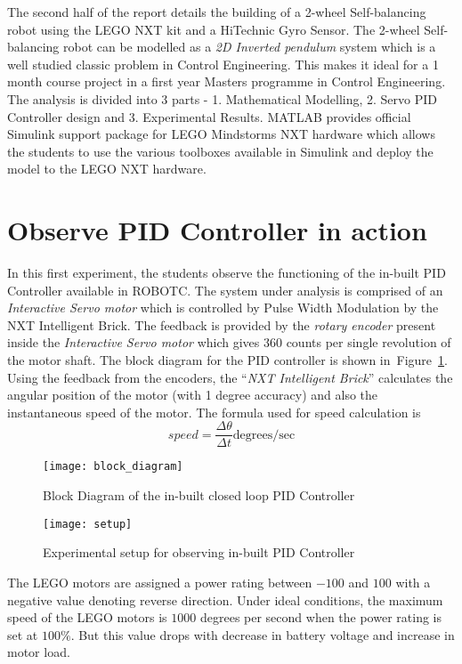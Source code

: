 \documentclass[paper=a4, fontsize=11pt]{scrartcl}
\numberwithin{equation}{section}        %
\numberwithin{figure}{section}          %
\numberwithin{table}{section}           %
\begin{document}
The second half of the report details the building of a 2-wheel Self-balancing robot using the LEGO NXT kit and a HiTechnic Gyro Sensor. The 2-wheel Self-balancing robot can be modelled as a \emph{2D Inverted pendulum} system which is a well studied classic problem in Control Engineering. This makes it ideal for a 1 month course project in a first year Masters programme in Control Engineering. The analysis is divided into 3 parts - 1. Mathematical Modelling, 2. Servo PID Controller design and 3. Experimental Results. MATLAB provides official Simulink support package for LEGO Mindstorms NXT hardware which allows the students to use the various toolboxes available in Simulink and deploy the model to the LEGO NXT hardware.

\section{Observe PID Controller in action}
In this first experiment, the students observe the functioning of the in-built PID Controller available in ROBOTC. The system under analysis is comprised of an \emph{Interactive Servo motor} which is controlled by Pulse Width Modulation by the NXT Intelligent Brick. The feedback is provided by the \emph{rotary encoder} present inside the \emph{Interactive Servo motor} which gives 360 counts per single revolution of the motor shaft. The block diagram for the PID controller is shown in~Figure~\ref{fig:block_diagram}. Using the feedback from the encoders, the ``\emph{NXT Intelligent Brick}'' calculates the angular position of the motor (with 1 degree accuracy) and also the instantaneous speed of the motor. The formula used for speed calculation is
\begin{equation}
speed = \frac{\Delta\theta}{\Delta{}t} \text{degrees/sec}
\end{equation}
\begin{figure}[!hbp]
	\texttt{[image: block\_diagram]}
	\caption{Block Diagram of the in-built closed loop PID Controller}
	\label{fig:block_diagram}
\end{figure}

\begin{figure}[!hbp]
	\texttt{[image: setup]}
	\caption{Experimental setup for observing in-built PID Controller}
	\label{fig:setup}
\end{figure}

The LEGO motors are assigned a power rating between $-100$ and $100$ with a negative value denoting reverse direction. Under ideal conditions, the maximum speed of the LEGO motors is $1000$ degrees per second when the power rating is set at $100\%$. But this value drops with decrease in battery voltage and increase in motor load. 
\end{document}
